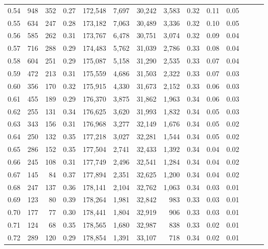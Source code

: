 \begin{tabular}{rrrrrrrrrrrrrr}
0.54 &    948 &  352 &  0.27 &  172,548 &    7,697 &  30,242 &   3,583 &  0.32 &  0.11 &      0.05 \\
0.55 &    634 &  247 &  0.28 &  173,182 &    7,063 &  30,489 &   3,336 &  0.32 &  0.10 &      0.05 \\
0.56 &    585 &  262 &  0.31 &  173,767 &    6,478 &  30,751 &   3,074 &  0.32 &  0.09 &      0.04 \\
0.57 &    716 &  288 &  0.29 &  174,483 &    5,762 &  31,039 &   2,786 &  0.33 &  0.08 &      0.04 \\
0.58 &    604 &  251 &  0.29 &  175,087 &    5,158 &  31,290 &   2,535 &  0.33 &  0.07 &      0.04 \\
0.59 &    472 &  213 &  0.31 &  175,559 &    4,686 &  31,503 &   2,322 &  0.33 &  0.07 &      0.03 \\
0.60 &    356 &  170 &  0.32 &  175,915 &    4,330 &  31,673 &   2,152 &  0.33 &  0.06 &      0.03 \\
0.61 &    455 &  189 &  0.29 &  176,370 &    3,875 &  31,862 &   1,963 &  0.34 &  0.06 &      0.03 \\
0.62 &    255 &  131 &  0.34 &  176,625 &    3,620 &  31,993 &   1,832 &  0.34 &  0.05 &      0.03 \\
0.63 &    343 &  156 &  0.31 &  176,968 &    3,277 &  32,149 &   1,676 &  0.34 &  0.05 &      0.02 \\
0.64 &    250 &  132 &  0.35 &  177,218 &    3,027 &  32,281 &   1,544 &  0.34 &  0.05 &      0.02 \\
0.65 &    286 &  152 &  0.35 &  177,504 &    2,741 &  32,433 &   1,392 &  0.34 &  0.04 &      0.02 \\
0.66 &    245 &  108 &  0.31 &  177,749 &    2,496 &  32,541 &   1,284 &  0.34 &  0.04 &      0.02 \\
0.67 &    145 &   84 &  0.37 &  177,894 &    2,351 &  32,625 &   1,200 &  0.34 &  0.04 &      0.02 \\
0.68 &    247 &  137 &  0.36 &  178,141 &    2,104 &  32,762 &   1,063 &  0.34 &  0.03 &      0.01 \\
0.69 &    123 &   80 &  0.39 &  178,264 &    1,981 &  32,842 &     983 &  0.33 &  0.03 &      0.01 \\
0.70 &    177 &   77 &  0.30 &  178,441 &    1,804 &  32,919 &     906 &  0.33 &  0.03 &      0.01 \\
0.71 &    124 &   68 &  0.35 &  178,565 &    1,680 &  32,987 &     838 &  0.33 &  0.02 &      0.01 \\
0.72 &    289 &  120 &  0.29 &  178,854 &    1,391 &  33,107 &     718 &  0.34 &  0.02 &      0.01 \\

\end{tabular}
